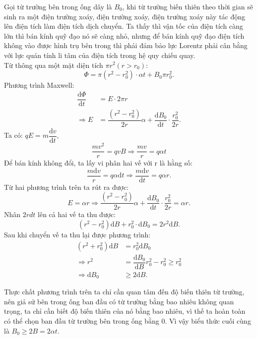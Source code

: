 \begin{loigiai}
Gọi từ trường bên trong ống dây là $B_0$, khi từ trường biến thiên theo thời gian sẽ sinh ra một điện trường xoáy, điện trường xoáy, điện trường xoáy này tác động lên điện tích làm điện tích dịch chuyển. Ta thấy thì vận tốc của điện tích càng lớn thì bán kính quỹ đạo nó sẽ càng nhỏ, nhưng để bán kính quỹ đạo điện tích không vào được hình trụ bên trong thì phải đảm bảo lực Lorentz phải cân bằng với lực quán tính li tâm của điện tích trong hệ quy chiếu quay.\\
Từ thông qua một mặt diện tích $\pi r^2 (r>r_0):$
$$\Phi = \pi (r^2-r_0^2)\cdot \alpha t + B_0\pi r_0^2.$$
Phương trình Maxwell:
\begin{align*}
\dfrac{\mathrm{d}\Phi}{\mathrm{d}t}&=E\cdot2\pi r\\
\Rightarrow E&=\dfrac{(r^2-r_0^2)}{2r}\alpha+\dfrac{\mathrm{d}B_0}{\mathrm{d}t}\cdot\dfrac{r_0^2}{2r}.
\end{align*}
Ta có: $qE=m\dfrac{\mathrm{d}v}{\mathrm{d}t}$,
$$\dfrac{mv^2}{r}=qvB\Rightarrow\dfrac{mv}{r}=q\alpha t$$
Để bán kính không đổi, ta lấy vi phân hai vế với r là hằng số:
$$\dfrac{m\mathrm{d}v}{r}=q\alpha\mathrm{d}t\Rightarrow\dfrac{m\mathrm{d}v}{\mathrm{d}t}=q\alpha r.$$
Từ hai phương trình trên ta rút ra được:
$$E=\alpha r \Rightarrow \dfrac{(r^2-r_0^2)}{2r}\alpha+\dfrac{\mathrm{d}B_0}{\mathrm{d}t}\cdot\dfrac{r_0^2}{2r}=\alpha r.$$
Nhân $2rdt$ lên cả hai vế ta thu được:
$$(r^2-r_0^2)\mathrm{d}B+r_0^2\cdot\mathrm{d}B_0=2r^2\mathrm{d}B.$$
Sau khi chuyển vế ta thu lại được phương trình:
\begin{align*}
    (r^2+r_0^2)\mathrm{d}B&=r_0^2\mathrm{d}B_0 \tag{*}\\
\Rightarrow r^2&=\dfrac{\mathrm{d}B_0}{\mathrm{d}B}r_0^2-r_0^2 \ge r_0^2 \\ \Rightarrow \mathrm{d}B_0 &\ge 2\mathrm{d}B. 
\end{align*}

Thực chất phương trình trên ta chỉ cần quan tâm đến độ biến thiên từ trường, nên giả sử bên trong ống ban đầu có từ trường bằng bao nhiêu không quan trọng, ta chỉ cần biết độ biến thiên của nó bằng bao nhiêu, vì thế ta hoàn toàn có thể chọn ban đầu từ trường bên trong ống bằng $0$.
Vì vậy biểu thức cuối cùng là $B_0 \ge 2B=2\alpha t.$
\end{loigiai}




